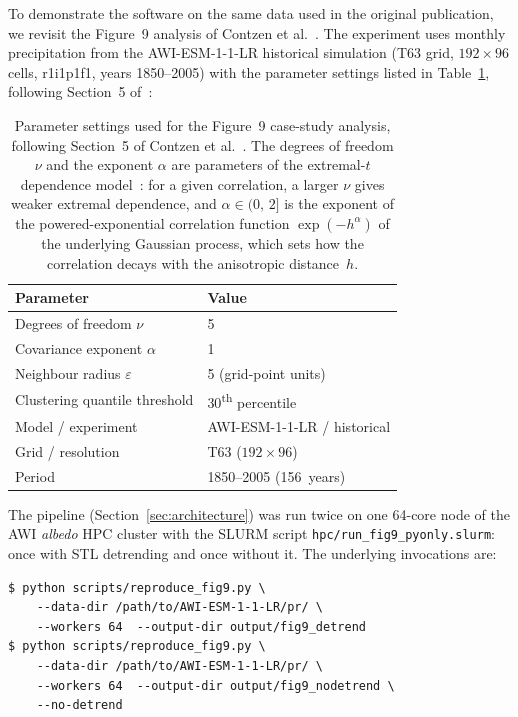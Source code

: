 \documentclass[preprint,12pt,a4paper]{elsarticle}
\newcommand{\rev}[1]{{#1}}
\newcommand{\revb}[1]{{#1}}
\newcommand{\revo}[1]{{#1}}
\begin{document}
\rev{To demonstrate the software on the same data used in the original
publication, we \revb{revisit the Figure~9 analysis} of Contzen et al.~\cite{contzen2025}.  The
experiment uses monthly precipitation from the AWI-ESM-1-1-LR
historical simulation (T63 grid, $192 \times 96$ cells, r1i1p1f1,
years 1850--2005) with the parameter settings listed in
Table~\ref{tab:fig9-params}, following Section~5 of~\cite{contzen2025}:}

\begin{table}[ht]
\centering
\begin{tabular}{ll}
\toprule
\textbf{Parameter} & \textbf{Value} \\
\midrule
Degrees of freedom $\nu$ & 5 \\
Covariance exponent $\alpha$ & 1 \\
Neighbour radius $\varepsilon$ & 5 (grid-point units) \\
Clustering quantile threshold & 30\textsuperscript{th} percentile \\
Model / experiment & AWI-ESM-1-1-LR / historical \\
Grid / resolution & T63 ($192 \times 96$) \\
Period & 1850--2005 (156~years) \\
\bottomrule
\end{tabular}
\caption{Parameter settings used for the Figure~9 \revb{case-study analysis},
  following Section~5 of Contzen et al.~\cite{contzen2025}. \revo{The degrees of
  freedom $\nu$ and the exponent $\alpha$ are parameters of the
  extremal-$t$ dependence model~\cite{opitz2013,contzen2025}: for a
  given correlation, a larger $\nu$ gives weaker extremal
  dependence, and $\alpha \in (0,\,2]$ is the exponent of the
  powered-exponential correlation function $\exp(-h^{\alpha})$ of
  the underlying Gaussian process, which sets how the correlation
  decays with the anisotropic distance~$h$.}}
\label{tab:fig9-params}
\end{table}

The pipeline (Section~\ref{sec:architecture}) was run twice on one
64-core node of the AWI \emph{albedo} HPC cluster with the SLURM
script \texttt{hpc/run\_fig9\_pyonly.slurm}: once with STL
detrending and once without it. The underlying invocations are:

\begin{lstlisting}[caption={\revb{Running the Figure~9 case study on HPC}.},
  label=lst:fig9, numbers=none]
$ python scripts/reproduce_fig9.py \
    --data-dir /path/to/AWI-ESM-1-1-LR/pr/ \
    --workers 64  --output-dir output/fig9_detrend
$ python scripts/reproduce_fig9.py \
    --data-dir /path/to/AWI-ESM-1-1-LR/pr/ \
    --workers 64  --output-dir output/fig9_nodetrend \
    --no-detrend
\end{lstlisting}
\end{document}
